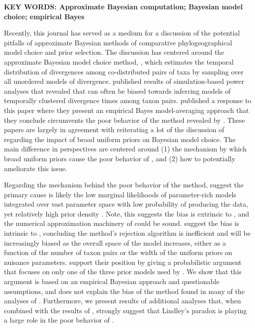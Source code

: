 \documentclass[letterpaper,12pt]{article}
\begin{document}
\begin{linenumbers}
{    \vspace{12pt}
    \noindent\textbf{KEY WORDS: Approximate Bayesian computation; Bayesian
        model choice; empirical Bayes} 

}

\newpage



\noindent Recently, this journal has served as a medium for a
discussion of the potential pitfalls of approximate Bayesian methods of
comparative phylogeographical model choice and prior selection.
The discussion has centered around the approximate Bayesian model choice method,
\msb, which estimates the temporal distribution of divergences among
co-distributed pairs of taxa \citep{Huang2011} by sampling over all
unordered models of divergence.
\citet{Oaks2012} published results of simulation-based power analyses that
revealed that \msb can often be biased towards inferring models of temporally
clustered divergence times among taxon pairs.
\citet{Hickerson2013} published a response to this paper where they present
an empirical Bayes model-averaging approach that they conclude circumvents the
poor behavior of the method revealed by \citet{Oaks2012}.
These papers are largely in agreement with \citet{Hickerson2013} reiterating a
lot of the discussion of
\citet{Oaks2012} regarding the impact of broad uniform priors on Bayesian model
choice.
The main difference in perspectives are centered around
(1) the mechanism by which broad uniform priors cause the poor behavior of
\msb, and
(2) how to potentially ameliorate this issue.

Regarding the mechanism behind the poor behavior of the method,
\citet{Oaks2012} suggest the primary cause is likely the low marginal
likelihoods of parameter-rich models integrated over vast parameter space with
low probability of producing the data, yet relatively high prior density
\citep[this is often referred to as Lindley's paradox;][]{Lindley1957}.
Note, this suggests the bias is extrinsic to \msb, and the numerical
approximation machinery of \msb could be sound.
\citet{Hickerson2013} suggest the bias is intrinsic to \msb, concluding the
method's rejection algorithm is inefficient and will be increasingly biased as
the overall space of the model increases, either as a function of the number of
taxon pairs or the width of the uniform priors on nuisance parameters.
\citet{Hickerson2013} support their position by giving a probabilistic argument
that focuses on only one of the three prior models used by \citet{Oaks2012}.
We show that this argument is based on an empirical Bayesian approach and
questionable assumptions, and does not explain the bias of the method found in
many of the analyses of \citet{Oaks2012}. 
Furthermore, we present results of additional analyses that, when combined
with the results of \citet{Oaks2012}, strongly suggest that Lindley's paradox
is playing a large role in the poor behavior of \msb.


\end{linenumbers}
\end{document}
